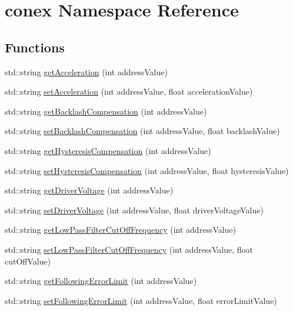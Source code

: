 \hypertarget{namespaceconex}{}\section{conex Namespace Reference}
\label{namespaceconex}
\subsection*{Functions}
\begin{DoxyCompactItemize}
\item 
std\+::string \hyperlink{namespaceconex_a9ccf7065a08f5cb5c21c45efcb0c76db}{get\+Acceleration} (int address\+Value)
\item 
std\+::string \hyperlink{namespaceconex_ae90d099ece6fb06e8eeb4ab3ad5df2bb}{set\+Acceleration} (int address\+Value, float acceleration\+Value)
\item 
std\+::string \hyperlink{namespaceconex_a8c9d7fa13308de3bfa68ea372986d490}{get\+Backlash\+Compensation} (int address\+Value)
\item 
std\+::string \hyperlink{namespaceconex_a8668932baaa1ff47f4bf37d6dabb1c42}{set\+Backlash\+Compensation} (int address\+Value, float backlash\+Value)
\item 
std\+::string \hyperlink{namespaceconex_a44852cd57a643f1a70ffff0ba772b28b}{get\+Hysteresis\+Compensation} (int address\+Value)
\item 
std\+::string \hyperlink{namespaceconex_a3a057c09b112f734431cb331669bc46b}{set\+Hysteresis\+Compensation} (int address\+Value, float hysteresis\+Value)
\item 
std\+::string \hyperlink{namespaceconex_a0588a5e5f42da8cb5041900bbfba4243}{get\+Driver\+Voltage} (int address\+Value)
\item 
std\+::string \hyperlink{namespaceconex_a07def2519839ea99940a654201ff40b9}{set\+Driver\+Voltage} (int address\+Value, float driver\+Voltage\+Value)
\item 
std\+::string \hyperlink{namespaceconex_acaa2df03ff5ad416b1ed256995a40966}{get\+Low\+Pass\+Filter\+Cut\+Off\+Frequency} (int address\+Value)
\item 
std\+::string \hyperlink{namespaceconex_a32f3870ece6ee316eff312c20fe069d3}{set\+Low\+Pass\+Filter\+Cut\+Off\+Frequency} (int address\+Value, float cut\+Off\+Value)
\item 
std\+::string \hyperlink{namespaceconex_a05d5f0585af94bb38ccf8037d86768e5}{get\+Following\+Error\+Limit} (int address\+Value)
\item 
std\+::string \hyperlink{namespaceconex_aecd28d691655d6fa73f28b2dd5922f8e}{set\+Following\+Error\+Limit} (int address\+Value, float error\+Limit\+Value)

\end{DoxyCompactItemize}
